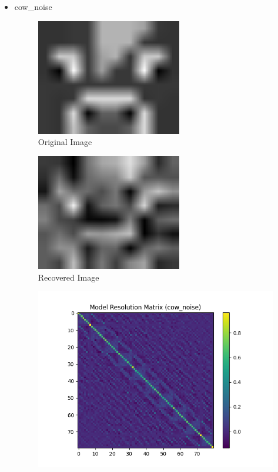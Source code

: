 \documentclass{article}
\begin{document}
\begin{itemize}
        \item cow\_noise
    \begin{figure}[h]
        \centering
        \includegraphics[width=0.6\textwidth]{images/greyscale/cow.png}
        \caption{Original Image}
    \end{figure}
    \begin{figure}[h]
        \centering
        \includegraphics[width=0.6\textwidth]{images/outputs/noise/cow_noise.png}
        \caption{Recovered Image}
    \end{figure}
    \begin{figure}[h]
        \centering
        \includegraphics[width=1\textwidth]{images/outputs/modelres/cow_noise.png}

\end{figure}
\end{itemize}
\end{document}
